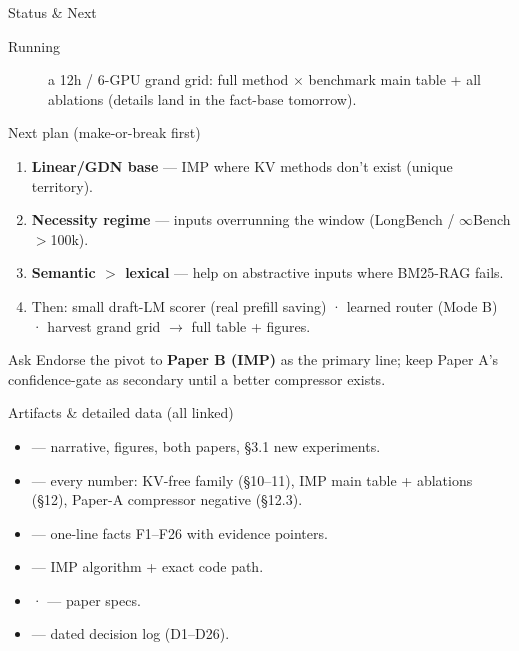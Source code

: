 \begin{frame}{Status \& Next}
  \small
  \begin{description}
    \item[Running] a 12h / 6-GPU grand grid: full method $\times$ benchmark main table + all ablations (details land in the fact-base tomorrow).
  \end{description}
  \begin{block}{Next plan (make-or-break first)}
    \begin{enumerate}
      \item \textbf{Linear/GDN base} — IMP where KV methods don't exist (unique territory).
      \item \textbf{Necessity regime} — inputs overrunning the window (LongBench / $\infty$Bench $>$100k).
      \item \textbf{Semantic $>$ lexical} — help on abstractive inputs where BM25-RAG fails.
      \item Then: small draft-LM scorer (real prefill saving) · learned router (Mode B) · harvest grand grid $\to$ full table + figures.
    \end{enumerate}
  \end{block}
  \begin{block}{Ask}
    Endorse the pivot to \textbf{Paper B (IMP)} as the primary line; keep Paper A's confidence-gate as secondary until a better compressor exists.
  \end{block}
\end{frame}

\begin{frame}{Artifacts \& detailed data (all linked)}
  \small
  \begin{itemize}
    \item {} — narrative, figures, both papers, §3.1 new experiments.
    \item {} — every number: KV-free family (§10--11), IMP main table + ablations (§12), Paper-A compressor negative (§12.3).
    \item {} — one-line facts F1--F26 with evidence pointers.
    \item {} — IMP algorithm + exact code path.
    \item {} ·  — paper specs.
    \item {} — dated decision log (D1--D26).
  \end{itemize}
\end{frame}
